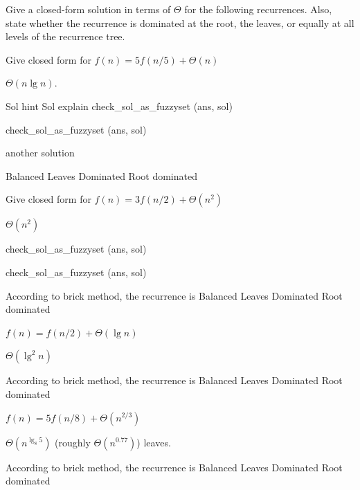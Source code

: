 \begin{problem}[40.]
Give a closed-form
solution in terms of $\Theta$ for the following recurrences.  Also, state
whether the recurrence is dominated at the root, the leaves, or
equally at all levels of the recurrence tree.


\ask[10.0]
Give closed form for  
$f(n) = 5f(n/5) + \Theta(n)$


\sol[0.5] 
$\Theta (n \lg n)$.

\hint Sol hint
\explain Sol explain
\algoc
check_sol_as_fuzzyset (ans, sol)


\algog
check_sol_as_fuzzyset (ans, sol)

\sol[1.5]
another solution

\onechoice[8.] 

\choice[1.0] Balanced
\choice[0.4] Leaves Dominated
\choice[0.6] Root dominated 



\ask[2.]
Give closed form for  
$f(n) = 3f(n/2) + \Theta(n^2)$

\sol
$\Theta(n^2)$

\algoc
check_sol_as_fuzzyset (ans, sol)

\algog
check_sol_as_fuzzyset (ans, sol)




\onechoice  According to brick method, the recurrence is
\choice Balanced
\choice Leaves Dominated
\choice* Root dominated

\ask[2.]
$f(n) = f(n/2) + \Theta(\lg n)$

\sol
$\Theta (\lg^2 n)$

\onechoice[10]  According to brick method, the recurrence is
\choice*[1.0] Balanced
\choice[0.2] Leaves Dominated
\choice Root dominated

\ask[2]
$f(n) = 5f(n/8) +\Theta(n^{2/3})$

\sol
$\Theta(n^{\lg_8 5})$ (roughly $\Theta(n^{0.77})$) leaves.





\onechoice  According to brick method, the recurrence is
\choice Balanced
\choice* Leaves Dominated
\choice Root dominated

\end{problem}


